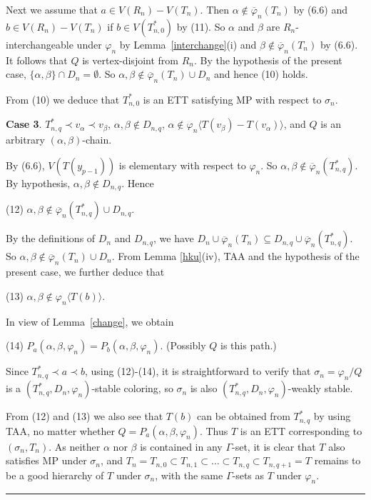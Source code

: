 \documentclass[11pt]{article}
\newcommand{\phibar}{\overline{\varphi}}
\newcommand{\phiv}{\varphi}
\def\qed{\hfill \rule{4pt}{7pt}}
\begin{document}
Next we assume that $a\in V(R_n)-V(T_n)$. Then $\alpha \notin \phibar_n (T_n)$ by (6.6) and 
$b \in V(R_n)-V(T_n)$ if $b \in V(T_{n,0}^*)$ by (11). So $\alpha$ and $\beta$ are $R_n$-interchangeable under 
$\varphi_n$ by Lemma~\ref{interchange}(i) and $\beta \notin \phibar_n (T_n)$ by (6.6). It follows that $Q$ is 
vertex-disjoint from $R_{n}$. By the hypothesis of the present case, $\{\alpha, \beta\} \cap D_{n} =\emptyset$. 
So $\alpha, \beta \notin \overline{\varphi}_n(T_n) \cup D_{n}$ and hence (10) holds.   

From (10) we deduce that $T_{n,0}^*$ is an ETT satisfying MP with respect to $\sigma_n$.
	  
{\bf Case 3}. $T_{n,q}^*\prec v_{\alpha} \prec v_{\beta}$, $\alpha,\beta\notin D_{n,q}$, $\alpha\notin \phiv_n \langle T(v_{\beta})-T(v_{\alpha}) \rangle$, and $Q$ is an arbitrary $(\alpha,\beta)$-chain.

By (6.6), $V(T(y_{p-1}))$ is elementary with respect to $\varphi_n$. So $\alpha,\beta\notin\phibar_n(T_{n,q}^*)$.
By hypothesis, $\alpha,\beta\notin D_{n,q}$. Hence 

(12) $\alpha,\beta\notin\phibar_n(T_{n,q}^*) \cup D_{n,q}$.  

\noindent By the definitions of $D_n$ and $D_{n,q}$, we have $ D_n \cup \phibar_n(T_n) \subseteq D_{n,q}\cup 
\phibar_n(T_{n,q}^*)$. So $\alpha,\beta \notin\phibar_n(T_n)\cup D_n$. From Lemma \ref{hku}(iv), TAA and the 
hypothesis of the present case, we further deduce that

(13) $\alpha, \beta \notin \varphi_n\langle T(b)\rangle$. 

\noindent In view of Lemma~\ref{change}, we obtain

(14) $P_a(\alpha,\beta,\varphi_n)=P_b(\alpha,\beta,\varphi_n)$. (Possibly $Q$ is this path.)  

Since $T_{n,q}^*\prec a \prec b$, using (12)-(14), it is straightforward to verify that $\sigma_n=\varphi_n/Q$ is a 
$(T_{n,q}^*, D_n,\varphi_n)$-stable coloring, so $\sigma_n$ is also $(T_{n,q}^*, D_n,\varphi_n)$-weakly stable. 

From (12) and (13) we also see that $T(b)$ can be obtained from $T_{n,q}^*$ by using TAA, no matter whether $Q=
P_a(\alpha,\beta,\varphi_n)$. Thus $T$ is an ETT corresponding to $(\sigma_n,T_n)$. As neither $\alpha$ nor $\beta$ is contained in any $\Gamma$-set,
it is clear that $T$ also satisfies MP under $\sigma_n$, and $T_n=T_{n,0} \subset T_{n,1} \subset \ldots \subset T_{n,q}\subset 
T_{n,q+1}=T$ remains to be a good hierarchy of $T$ under $\sigma_n$, with the same $\Gamma$-sets as $T$ under 
$\varphi_n$. \qed 
\end{document}
